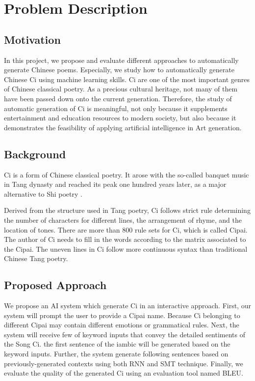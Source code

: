 \section{Problem Description}
\subsection{Motivation} 
%
In this project, we propose and evaluate different approaches to automatically generate Chinese poems. 
%
Especially, we study how to automatically generate Chinese Ci using machine learning skills.
%
Ci are one of the most important genres of Chinese classical poetry. 
%
As a precious cultural heritage, not many of them have been passed down onto the current generation.
%
Therefore, the study of automatic generation of Ci is meaningful, not only because it supplements entertainment and education resources to modern society, but also because it demonstrates the feasibility of applying artificial intelligence in Art generation. 
%

\subsection{Background}
%
Ci is a form of Chinese classical poetry. It arose with the so-called banquet music in Tang dynasty and reached its peak one hundred years later, as a major alternative to Shi poetry\cite{cai2008chinesepoetry} .

Derived from the structure used in Tang poetry, Ci follows strict rule determining the number of characters for different lines, the arrangement of rhyme, and the location of tones. There are more than 800 rule sets for Ci, which is called Cipai\cite{wikici}. The author of Ci needs to fill in the words according to the matrix associated to the Cipai. The uneven lines in Ci follow more continuous syntax than traditional Chinese Tang poetry\cite{cai2008chinesepoetry}.

\subsection{Proposed Approach}
%
We propose an AI system which generate Ci in an interactive approach.
%
First, our system will prompt the user to provide a Cipai name.
%
Because Ci belonging to different Cipai may contain different emotions or grammatical rules.
%
Next, the system will receive few of keyword inputs that convey the detailed sentiments of the Song Ci.
%
the first sentence of the iambic will be generated based on the keyword inputs.
%
Further, the system generate following sentences based on previously-generated contexts using both RNN and SMT technique.
%
Finally, we evaluate the quality of the generated Ci using an evaluation tool named BLEU.

